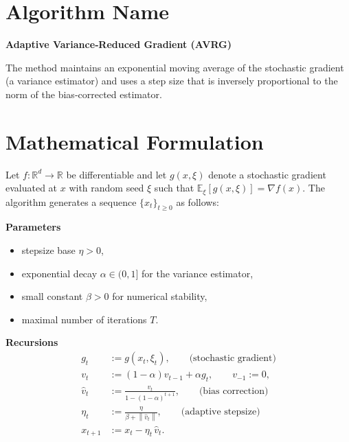 \documentclass{article}
\newcommand{\E}{\mathbb{E}}
\newcommand{\norm}[1]{\left\lVert#1\right\rVert}
\begin{document}
\section*{Algorithm Name}
\textbf{Adaptive Variance‑Reduced Gradient (AVRG)}  

The method maintains an exponential moving average of the stochastic gradient (a variance estimator) and uses a step size that is inversely proportional to the norm of the bias‑corrected estimator.

\section*{Mathematical Formulation}
Let $f:\mathbb{R}^d\rightarrow\mathbb{R}$ be differentiable and let $g(x,\xi)$ denote a stochastic gradient evaluated at $x$ with random seed $\xi$ such that $\E_{\xi}[g(x,\xi)]=\nabla f(x)$.  
The algorithm generates a sequence $\{x_t\}_{t\ge 0}$ as follows:

\bigskip
\noindent\textbf{Parameters}
\begin{itemize}[noitemsep]
    \item stepsize base $\eta>0$,
    \item exponential decay $\alpha\in(0,1]$ for the variance estimator,
    \item small constant $\beta>0$ for numerical stability,
    \item maximal number of iterations $T$.
\end{itemize}
\bigskip

\noindent\textbf{Recursions}
\begin{align}
    g_t &:= g(x_t,\xi_t), \qquad\text{(stochastic gradient)} \label{eq:gt}\\
    v_t &:= (1-\alpha)v_{t-1}+\alpha g_t, \qquad v_{-1}:=0, \label{eq:vt}\\
    \hat v_t &:= \frac{v_t}{1-(1-\alpha)^{t+1}}, \qquad\text{(bias correction)} \label{eq:hatvt}\\
    \eta_t &:= \frac{\eta}{\beta+\norm{\hat v_t}}, \qquad\text{(adaptive stepsize)} \label{eq:etat}\\
    x_{t+1} &:= x_t-\eta_t\,\hat v_t . \label{eq:xt}
\end{align}
\end{document}

